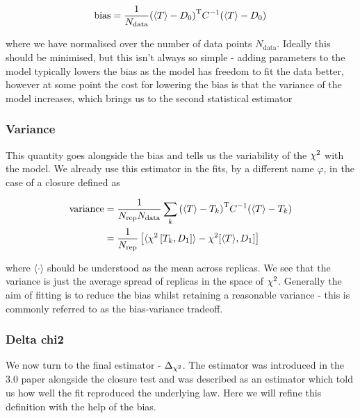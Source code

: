\begin{equation}
    \mathrm{bias} = \frac{1}{N_{\mathrm{data}}} {(\langle T \rangle - D_{0})}^{\mathrm{T}} C^{-1} (\langle T \rangle - D_{0})
\end{equation}

where we have normalised over the number of data points $N_{\mathrm{data}}$. Ideally this should
be minimised, but this isn't always so simple - adding parameters to the model
typically lowers the bias as the model has freedom to fit the data better, however at some point the
cost for lowering the bias is that the variance of the model increases, which brings us to the second
statistical estimator

\subsubsection*{Variance}

This quantity goes alongside the bias and tells us the variability of the $\chi^{2}$ with the model. We
already use this estimator in the fits, by a different name $\varphi$, in the case of a closure
defined as

\begin{equation}
    \begin{split}
        \mathrm{variance} &= \frac{1}{N_{\mathrm{rep}} N_{\mathrm{data}}} \sum_{k} {(\langle T \rangle - T_{k})}^{\mathrm{T}} C^{-1} (\langle T \rangle - T_{k}) \\
        &= \frac{1}{N_{\mathrm{rep}}} \left[ \langle \chi^{2} \left[ T_{k}, D_{1} \right] \rangle - \chi^{2}[\langle T \rangle, D_{1}] \right]
    \end{split}
\end{equation}

where $\langle \cdot \rangle$ should be understood as the mean across replicas. We see
that the variance is just the average spread of replicas in the space of $\chi^{2}$.
Generally the aim of fitting is to reduce the bias whilst retaining a reasonable
variance - this is commonly referred to as the bias-variance tradeoff.

\subsubsection*{Delta chi2}

We now turn to the final estimator - $\Delta_{\chi^{2}}$. The estimator was introduced in the
3.0 paper alongside the closure test and was described as an estimator which told
us how well the fit reproduced the underlying law. Here we will refine this definition
with the help of the bias.

